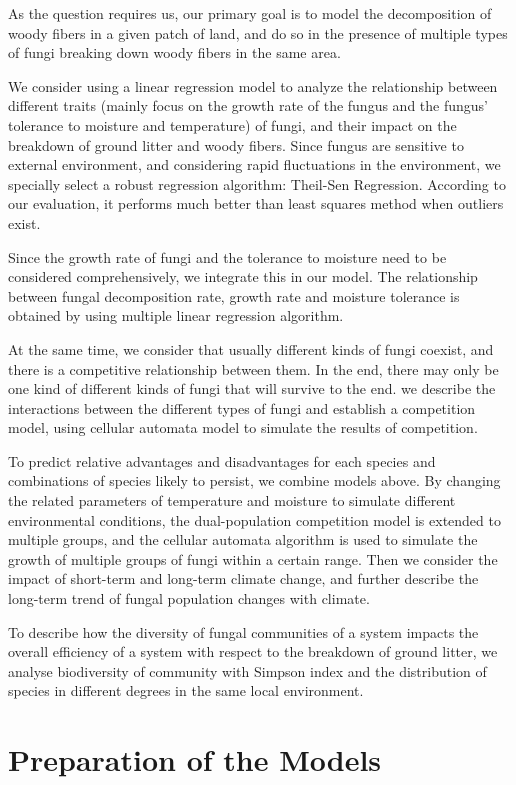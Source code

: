 \documentclass{mcmthesis}
\begin{document}
As the question requires us, our primary goal is to model the decomposition of woody fibers in a given patch of land, and do so in the presence of multiple types of fungi breaking down woody fibers in the same area.

We consider using a linear regression model to analyze the relationship between different traits (mainly focus on the growth rate of the fungus and the fungus' tolerance to moisture and temperature) of fungi, and their impact on the breakdown of ground litter and woody fibers. Since fungus are sensitive to external environment, and considering rapid fluctuations in the environment, we specially select a robust regression algorithm: Theil-Sen Regression. According to our evaluation, it performs much better than least squares method when outliers exist.

Since the growth rate of fungi and the tolerance to moisture need to be considered comprehensively, we integrate this in our model. The relationship between fungal decomposition rate, growth rate and moisture tolerance is obtained by using multiple linear regression algorithm. 

At the same time, we consider that usually different kinds of fungi coexist, and there is a competitive relationship between them. In the end, there may only be one kind of different kinds of fungi that will survive to the end. we describe the interactions between the different types of fungi and establish a competition model, using cellular automata model to simulate the results of competition.

To predict relative advantages and disadvantages for each species and combinations of species likely to persist, we combine models above. By changing the related parameters of temperature and moisture to simulate different environmental conditions, the dual-population competition model is extended to multiple groups, and the cellular automata algorithm is used to simulate the growth of multiple groups of fungi within a certain range. Then we consider the impact of short-term and long-term climate change, and further describe the long-term trend of fungal population changes with climate. 

To describe how the diversity of fungal communities of a system impacts the overall efficiency of a system with respect to the breakdown of ground litter, we analyse biodiversity of community with Simpson index and the distribution of species in different degrees in the same local environment.

\section{Preparation of the Models}
\end{document}
